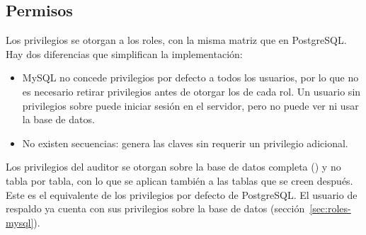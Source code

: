 \subsection{Permisos}

Los privilegios se otorgan a los roles, con la misma matriz que en PostgreSQL. Hay dos diferencias que simplifican la implementación:

\begin{itemize}[leftmargin=*]
	\item MySQL no concede privilegios por defecto a todos los usuarios, por lo que no es necesario retirar privilegios antes de otorgar los de cada rol. Un usuario sin privilegios sobre  puede iniciar sesión en el servidor, pero no puede ver ni usar la base de datos.
	\item No existen secuencias:  genera las claves sin requerir un privilegio adicional.
\end{itemize}

Los privilegios del auditor se otorgan sobre la base de datos completa () y no tabla por tabla, con lo que se aplican también a las tablas que se creen después. Este es el equivalente de los privilegios por defecto de PostgreSQL. El usuario de respaldo ya cuenta con sus privilegios sobre la base de datos (sección~\ref{sec:roles-mysql}).

